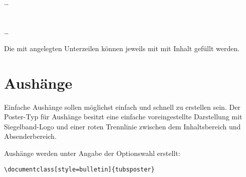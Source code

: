 \begin{Declaration}
  \\%
  \quad\dots\\
  \\
  \\%
  \quad\dots\\
\end{Declaration}

Die mit  angelegten Unterzeilen können jeweils mit 
 mit Inhalt gefüllt werden.


\clearpage
\section{Aushänge}

Einfache Aushänge sollen möglichst einfach und schnell zu erstellen sein.
Der Poster-Typ für Aushänge besitzt eine einfache voreingestellte Darstellung
mit Siegelband-Logo und einer roten Trennlinie zwischen dem Inhaltsbereich
und Absenderbereich.

Aushänge werden unter Angabe der Optionswahl
 erstellt:
\begin{lstlisting}
\documentclass[style=bulletin]{tubsposter}
\end{lstlisting}







